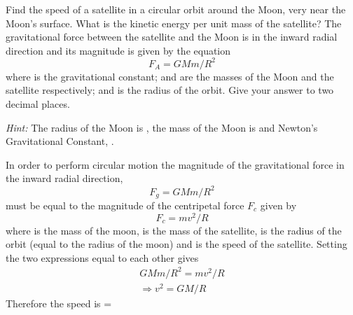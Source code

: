 \begin{problem}
{Find the speed of a satellite in a circular orbit around the Moon, very near the Moon's surface. What is the kinetic energy per unit mass of the satellite?
The gravitational force  between the satellite and the Moon is in the inward radial direction and its magnitude is given by the equation 
\begin{equation*}
F_A=GMm/R^2
\end{equation*}
where  is the gravitational constant;  and  are the masses of the Moon and the satellite respectively; and  is the radius of the orbit. Give your answer to two decimal places.

\emph{Hint:} The radius of the Moon is , the mass of the Moon is  and Newton's Gravitational Constant, .} 
{}
{In order to perform circular motion the magnitude of the gravitational force  in the inward radial direction, 
\begin{equation*} F_g=GMm/R^2 \end{equation*}
must be equal to the magnitude of the centripetal force $F_c$ given by 
\begin{equation*} F_c=mv^2/R \end{equation*}
where  is the mass of the moon,  is the mass of the satellite,  is the radius of the orbit (equal to the radius of the moon) and  is the speed of the satellite. Setting the two expressions equal to each other gives
\begin{align*} GMm/R^2=mv^2/R \\ \Rightarrow v^2=GM/R \end{align*}
Therefore the speed is  = 
}
\end{problem}